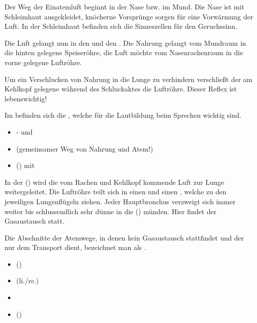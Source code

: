 {
Der Weg der Einatemluft beginnt in der Nase bzw. im Mund. Die Nase ist
mit Schleimhaut ausgekleidet, knöcherne Vorsprünge sorgen für
eine Vorwärmung der Luft. In der Schleimhaut be\-finden sich die
Sinneszellen für den Geruchssinn. 


Die Luft gelangt nun in den  und den
.  Die Nahrung gelangt vom Mundraum in die
hinten gelegene Speiseröhre, die Luft möchte vom Nasen\-rachen\-raum in die vorne gelegene Luftröhre. 

Um ein Verschlucken von Nahrung in die Lunge zu verhindern
verschließt der am Kehlkopf gelegene 
während des Schluckaktes die Luftröhre. Dieser Reflex ist lebenswichtig! 

Im   befinden sich die ,
welche für die Lautbildung beim Sprechen wichtig sind.
}{
\begin{itemize}
    \item {}- und   
    \item {} (gemeinsamer Weg von Nahrung und
    Atem!)  
    \item {} () mit
       
\end{itemize}
}{}{}{}

{
In der  () wird die vom Rachen
und Kehlkopf kommende Luft zur Lunge weitergeleitet. Die Luftröhre teilt sich in einen
 und einen  ,
welche zu den jeweiligen Lungenflügeln ziehen. Jeder Hauptbronchus verzweigt sich immer weiter
bis schlussendlich sehr dünne  in die
 () münden. Hier findet
der Gasaustausch statt.

Die Abschnitte der Atemwege, in denen kein Gasaustausch
stattfindet und der nur dem Transport dient, bezeichnet man
als {\quotedblbase}.
}{
\begin{itemize}
    \item {}
    ()
    \item {} (li./re.)
    \item {}
    \item {}
    ()
\end{itemize}
}{}{}{}



